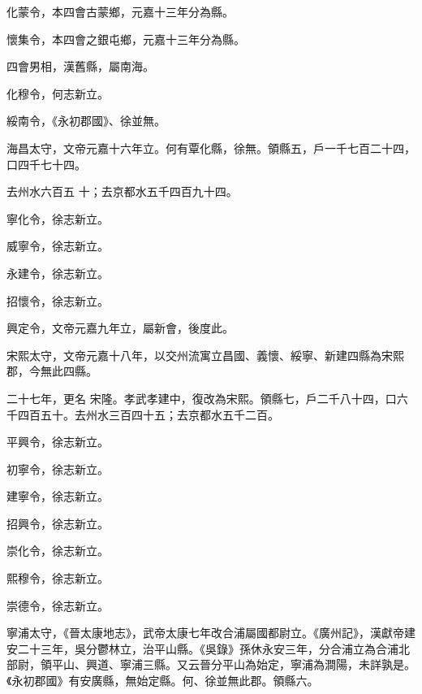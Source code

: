 \begin{pinyinscope}
 化蒙令，本四會古蒙鄉，元嘉十三年分為縣。



 懷集令，本四會之銀屯鄉，元嘉十三年分為縣。



 四會男相，漢舊縣，屬南海。



 化穆令，何志新立。



 綏南令，《永初郡國》、徐並無。



 海昌太守，文帝元嘉十六年立。何有覃化縣，徐無。領縣五，戶一千七百二十四，口四千七十四。



 去州水六百五
 十；去京都水五千四百九十四。



 寧化令，徐志新立。



 威寧令，徐志新立。



 永建令，徐志新立。



 招懷令，徐志新立。



 興定令，文帝元嘉九年立，屬新會，後度此。



 宋熙太守，文帝元嘉十八年，以交州流寓立昌國、義懷、綏寧、新建四縣為宋熙郡，今無此四縣。



 二十七年，更名
 宋隆。孝武孝建中，復改為宋熙。領縣七，戶二千八十四，口六千四百五十。去州水三百四十五；去京都水五千二百。



 平興令，徐志新立。



 初寧令，徐志新立。



 建寧令，徐志新立。



 招興令，徐志新立。



 崇化令，徐志新立。



 熙穆令，徐志新立。



 崇德令，徐志新立。



 寧浦太守，《晉太康地志》，武帝太康七年改合浦屬國都尉立。《廣州記》，漢獻帝建安二十三年，吳分鬱林立，治平山縣。《吳錄》孫休永安三年，分合浦立為合浦北部尉，領平山、興道、寧浦三縣。又云晉分平山為始定，寧浦為澗陽，未詳孰是。《永初郡國》有安廣縣，無始定縣。何、徐並無此郡。領縣六。




\end{pinyinscope}
